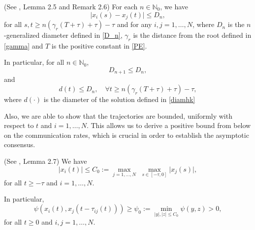 \documentclass[11pt]{article}
\begin{document}
	\begin{lem}\label{lemmadiamonoff}{(See \cite{CCP}, {Lemma 2.5 and Remark 2.6})}
		For each $n\in \mathbb{N}_0$, we have 
		\begin{equation}\label{diamonoff}
			\lvert x_i(s)-x_j(t)\rvert\leq D_n,
		\end{equation}
		for all  $s,t\geq n(\gamma_r (T+\tau)+\tau)-\tau$ and for any $i,j=1,\dots,N$, where $D_n$ is the $n$-generalized diameter defined in \eqref{D_n}, $\gamma_r$ is the distance from the root defined in \eqref{gamma} and $T$ is the positive constant in \eqref{PE}.
		
		In particular, for all $n\in \mathbb{N}_0$, 	
		\begin{equation}\label{Dndec}
			D_{n+1}\leq D_n,
		\end{equation}
		and
	\begin{equation}\label{diamonoff2}
		d(t)\leq D_n,\quad \forall t\geq n(\gamma_r (T+\tau)+\tau)-\tau,
	\end{equation}
	where $d(\cdot)$ is the diameter of the solution defined in \eqref{diamhk}
	\end{lem}
Also, we are able to show that the trajectories are bounded, uniformly with respect to $t$ and $i=1,\dots,N$. This allows us to derive a positive bound from below on the communication rates, which is crucial in order to establish the asymptotic consensus.
	\begin{lem}\label{L3onoff}{(See \cite{CCP}, {Lemma 2.7})}
		We have \begin{equation}\label{boundsolonoff}
			\lvert x_{i}(t)\rvert\leq C_{0}:=\max_{j=1,\dots,N}\,\,\max_{s\in [-\tau, 0]}\lvert x_{j}(s)\rvert,
		\end{equation}
        for all $t\geq -\tau$ and $i=1,\dots,N$. 
        
        In particular,        \begin{equation}\label{stima_psionoff}
			\psi (x_i(t), x_j(t-\tau_{ij}(t)))\ge \psi_{0}:=\min_{\vert y\vert, \vert z\vert \le  C_{0}}\psi(y,z)>0,
		\end{equation}
		for all $t\ge 0$ and $i,j=1,\dots, N$.
	\end{lem}
	
\end{document}
